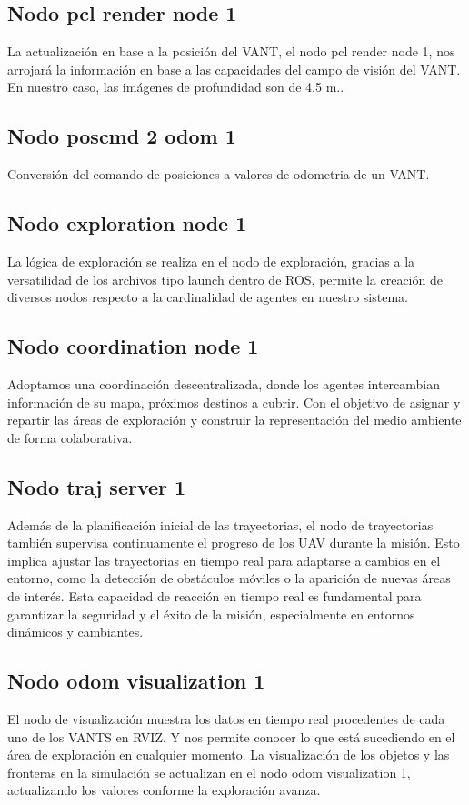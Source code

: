 \subsection*{Nodo pcl render node 1}
La actualización en base a la posición del VANT, el nodo pcl render node 1, nos arrojará la información en base a las capacidades del campo de visión del VANT.
En nuestro caso, las imágenes de profundidad son de 4.5 m..

\subsection*{Nodo poscmd 2 odom 1}
Conversión del comando de posiciones a valores de odometria de un VANT.

\subsection*{Nodo exploration node 1}

La lógica de exploración se realiza en el nodo de exploración, gracias a la versatilidad de los archivos tipo launch dentro de ROS, permite la creación de diversos nodos respecto a la cardinalidad de agentes en nuestro sistema.

\subsection*{Nodo coordination node 1}

Adoptamos una coordinación descentralizada, donde los agentes intercambian información de su mapa, próximos destinos a cubrir.
Con el objetivo de asignar y repartir las áreas de exploración y construir la representación del medio ambiente de forma colaborativa.

\subsection*{Nodo traj server 1}
Además de la planificación inicial de las trayectorias, el nodo de trayectorias también supervisa continuamente el progreso de los UAV durante la misión. Esto implica ajustar las trayectorias en tiempo real para adaptarse a cambios en el entorno, como la detección de obstáculos móviles o la aparición de nuevas áreas de interés. Esta capacidad de reacción en tiempo real es fundamental para garantizar la seguridad y el éxito de la misión, especialmente en entornos dinámicos y cambiantes.

\subsection*{Nodo odom visualization 1}

El nodo de visualización muestra los datos en tiempo real procedentes de cada uno de los VANTS en RVIZ. Y nos permite conocer lo que está sucediendo en el área de exploración en cualquier momento.
La visualización de los objetos y las fronteras en la simulación se actualizan en el nodo odom visualization 1, actualizando los valores conforme la exploración avanza.
